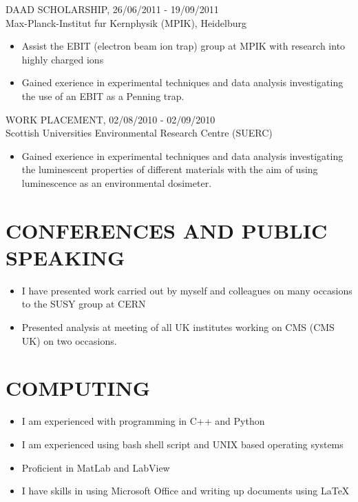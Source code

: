 \documentclass[9pt]{res} %
\begin{document}
\begin{resume}
DAAD SCHOLARSHIP, 26/06/2011 - 19/09/2011\\
\vspace{0.1cm}
Max-Planck-Institut fur Kernphysik (MPIK), Heidelburg
   \begin{itemize}\itemsep -2pt  %
   \item Assist the EBIT (electron beam ion trap) group at MPIK with research into highly charged ions
   \item Gained exerience in experimental techniques and data analysis investigating the use of an EBIT as a Penning trap.
   \end{itemize}

WORK PLACEMENT, 02/08/2010 - 02/09/2010\\
\vspace{0.1cm}
Scottish Universities Environmental Research Centre (SUERC)
   \begin{itemize} \itemsep -2pt  %
   \item Gained exerience in experimental techniques and data analysis investigating the luminescent properties of different materials with the aim of using luminescence as an environmental dosimeter.
 \end{itemize}

\section{CONFERENCES AND PUBLIC SPEAKING}
 \begin{itemize}
   \item I have presented work carried out by myself and colleagues on many occasions to the SUSY group at CERN 
   \item Presented analysis at meeting of all UK institutes working on CMS (CMS UK) on two occasions.
 \end{itemize}

\section{COMPUTING}
 \begin{itemize}
   \item I am experienced with programming in C++ and Python
   \item I am experienced using bash shell script and UNIX based operating systems
   \item Proficient in MatLab and LabView
   \item I have skills in using Microsoft Office and writing up documents using LaTeX
 \end{itemize}


\end{resume}
\end{document}
